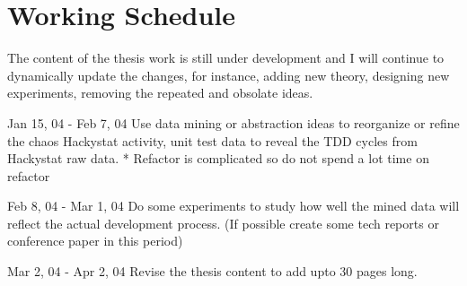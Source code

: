 
\chapter{Working Schedule}
The content of the thesis work is still under development and I will continue to dynamically update the changes, for instance, adding new theory, designing new experiments, removing the repeated and obsolate ideas. 

Jan 15, 04 - Feb 7, 04
   Use data mining or abstraction ideas to reorganize or refine the chaos Hackystat activity, unit test data to reveal the TDD cycles from Hackystat raw data.
   * Refactor is complicated so do not spend a lot time on refactor
   
Feb 8, 04 - Mar 1, 04
   Do some experiments to study how well the mined data will reflect the actual development process.
   (If possible create some tech reports or conference paper in this period)

Mar 2, 04 - Apr 2, 04
   Revise the thesis content to add upto 30 pages long. 














